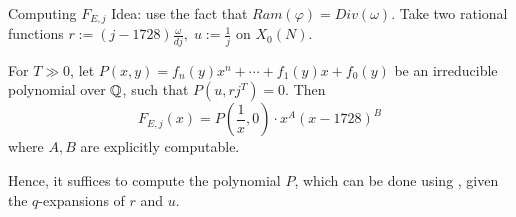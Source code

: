 \documentclass[handout]{beamer}
\begin{document}
\begin{frame}{Computing $F_{E,j}$}
Idea: use the fact that $Ram(\varphi) = Div(\omega)$. Take two rational functions 
$r := (j-1728)  \frac{\omega}{{d j}}, \;  u := \frac{1}{j}$ on $X_0(N)$. 



\begin{Prop}[C.]
For $T \gg 0$, let $P(x,y) = f_n(y)x^n + \cdots + f_1(y)x + f_0(y)$ be an irreducible polynomial over $\mathbb{Q}$,  such that $P(u, rj^T) = 0$.  Then
\[
		F_{E,j}(x) = P \left(\frac{1}{x}, 0 \right) \cdot x^{A} (x - 1728)^B
\]	
where $A,B$ are explicitly computable. 
\end{Prop}

Hence,  it suffices to compute the polynomial $P$, which can be done using , given the 
$q$-expansions of $r$ and $u$. 

\end{frame}










\end{document}
